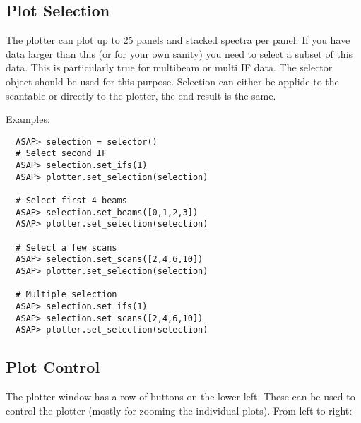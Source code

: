 \documentclass[11pt]{article}
\begin{document}
\subsection{Plot Selection}
\label{sec:plotter_cursor}

The plotter can plot up to 25 panels and
stacked spectra per panel. If you have data larger than this (or for
your own sanity) you need to select a subset of this data. This is
particularly true for multibeam or multi IF data. The selector object
should be used for this purpose. Selection can either be applide to
the scantable or directly to the plotter, the end result is the same.

Examples:

\begin{verbatim}
  ASAP> selection = selector()
  # Select second IF
  ASAP> selection.set_ifs(1)
  ASAP> plotter.set_selection(selection)

  # Select first 4 beams
  ASAP> selection.set_beams([0,1,2,3])
  ASAP> plotter.set_selection(selection)

  # Select a few scans
  ASAP> selection.set_scans([2,4,6,10])
  ASAP> plotter.set_selection(selection)

  # Multiple selection
  ASAP> selection.set_ifs(1)
  ASAP> selection.set_scans([2,4,6,10])
  ASAP> plotter.set_selection(selection)

\end{verbatim}

\subsection{Plot Control}

The plotter window has a row of buttons on the
lower left. These can be used to control the plotter (mostly for
zooming the individual plots). From left to right:
\end{document}
